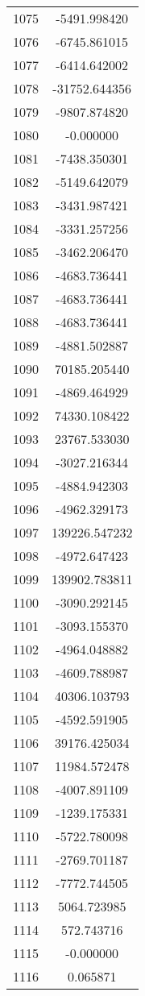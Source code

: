 \documentclass[12pt]{article}
\begin{document}
\begin{longtable}{@{}cc@{}}
1075 & -5491.998420 \\
1076 & -6745.861015 \\
1077 & -6414.642002 \\
1078 & -31752.644356 \\
1079 & -9807.874820 \\
1080 & -0.000000 \\
1081 & -7438.350301 \\
1082 & -5149.642079 \\
1083 & -3431.987421 \\
1084 & -3331.257256 \\
1085 & -3462.206470 \\
1086 & -4683.736441 \\
1087 & -4683.736441 \\
1088 & -4683.736441 \\
1089 & -4881.502887 \\
1090 & 70185.205440 \\
1091 & -4869.464929 \\
1092 & 74330.108422 \\
1093 & 23767.533030 \\
1094 & -3027.216344 \\
1095 & -4884.942303 \\
1096 & -4962.329173 \\
1097 & 139226.547232 \\
1098 & -4972.647423 \\
1099 & 139902.783811 \\
1100 & -3090.292145 \\
1101 & -3093.155370 \\
1102 & -4964.048882 \\
1103 & -4609.788987 \\
1104 & 40306.103793 \\
1105 & -4592.591905 \\
1106 & 39176.425034 \\
1107 & 11984.572478 \\
1108 & -4007.891109 \\
1109 & -1239.175331 \\
1110 & -5722.780098 \\
1111 & -2769.701187 \\
1112 & -7772.744505 \\
1113 & 5064.723985 \\
1114 & 572.743716 \\
1115 & -0.000000 \\
1116 & 0.065871 \\

\end{longtable}
\end{document}
